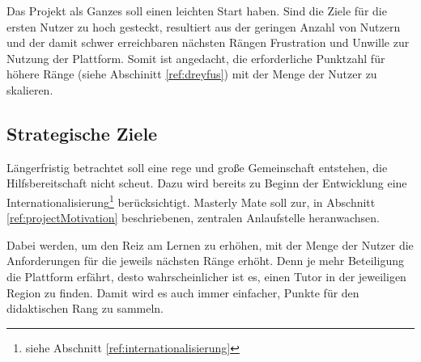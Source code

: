 Das Projekt als Ganzes soll einen leichten Start haben. Sind die Ziele für die
ersten Nutzer zu hoch gesteckt, resultiert aus der geringen Anzahl von Nutzern
und der damit schwer erreichbaren nächsten Rängen Frustration und Unwille zur
Nutzung der Plattform. Somit ist angedacht, die erforderliche Punktzahl für
höhere Ränge (siehe Abschinitt \ref{ref:dreyfus}) mit der Menge der Nutzer zu
skalieren.

\subsection{Strategische Ziele}
Längerfristig betrachtet soll eine rege und große Gemeinschaft entstehen, die
Hilfsbereitschaft nicht scheut. Dazu wird bereits zu Beginn der Entwicklung eine
Internationalisierung\footnote{siehe Abschnitt \ref{ref:internationalisierung}}
berücksichtigt. Masterly Mate soll zur, in Abschnitt \ref{ref:projectMotivation}
beschriebenen, zentralen Anlaufstelle heranwachsen.

Dabei werden, um den Reiz am Lernen zu erhöhen, mit der Menge der Nutzer die
Anforderungen für die jeweils nächsten Ränge erhöht. Denn je mehr Beteiligung
die Plattform erfährt, desto wahrscheinlicher ist es, einen Tutor in der
jeweiligen Region zu finden. Damit wird es auch immer einfacher, Punkte für den
didaktischen Rang zu sammeln.
